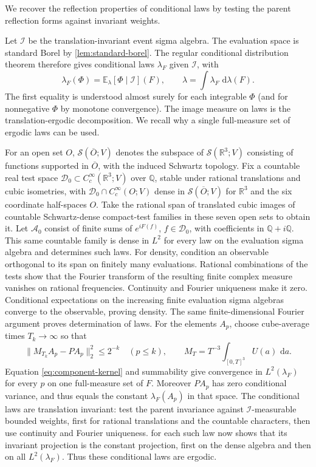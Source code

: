 \documentclass[11pt,letterpaper,reqno]{amsart}
\newcommand{\R}{\mathbb R}
\newcommand{\E}{\mathbb E}
\newcommand{\dd}{\,\mathrm d}
\newcommand{\Sspace}{\mathcal S}
\begin{document}
We recover the reflection properties of conditional laws by
testing the parent reflection forms against invariant weights.

Let $\mathcal I$ be the translation-invariant event sigma algebra.
The evaluation space is standard Borel by \cref{lem:standard-borel}.
The regular conditional distribution theorem
\cite[Theorems~4.1.16--4.1.17]{Durrett2019} therefore gives conditional laws $\lambda_F$ given $\mathcal I$, with
\begin{equation}\label{eq:component-kernel}
 \lambda_F(\Phi)=\E_\lambda[\Phi\mid\mathcal I](F),\qquad
 \lambda=\int\lambda_F\,\dd\lambda(F).
\end{equation}
The first equality is understood almost surely for each integrable
$\Phi$ (and for nonnegative $\Phi$ by monotone convergence).
The image measure on laws is the translation-ergodic decomposition.
We recall why a single full-measure set of ergodic laws can be used.

For an open set $O$, $\Sspace(\overline O;V)$ denotes
the subspace of $\Sspace(\R^3;V)$ consisting of functions
supported in $\overline O$, with the induced Schwartz topology.
Fix a countable real test space $\mathcal D_0\subset C_c^\infty(\R^3;V)$
over $\mathbb Q$, stable under rational translations and cubic
isometries, with $\mathcal D_0\cap C_c^\infty(O;V)$ dense
in $\Sspace(\overline O;V)$ for $\R^3$ and the six coordinate
half-spaces $O$. Take the rational span of translated cubic images
of countable Schwartz-dense compact-test families in these seven
open sets to obtain it.
Let $\mathcal A_0$ consist of finite sums of $e^{iF(f)}$,
$f\in\mathcal D_0$, with coefficients in $\mathbb Q+i\mathbb Q$.
This same countable family is dense in $L^2$ for every law on the
evaluation sigma algebra and determines such laws. For density,
condition an observable orthogonal to its span on finitely many
evaluations. Rational combinations of the tests show that the
Fourier transform of the resulting finite complex measure vanishes
on rational frequencies. Continuity and Fourier uniqueness make it
zero. Conditional expectations on the increasing finite evaluation
sigma algebras converge to the observable, proving density.
The same finite-dimensional Fourier argument proves determination
of laws. For the elements
$A_p$, choose cube-average times $T_k\to\infty$ so that
\[
 \|M_{T_k}A_p-PA_p\|_2^2\le2^{-k}\quad(p\le k),\qquad
 M_T=T^{-3}\int_{[0,T]^3}U(a)\,\dd a.
\]
Equation \eqref{eq:component-kernel} and summability give convergence
in $L^2(\lambda_F)$ for every $p$ on one full-measure set of $F$.
Moreover $PA_p$ has zero conditional variance, and thus equals
the constant $\lambda_F(A_p)$ in that space. The conditional laws
are translation invariant: test the parent invariance against
$\mathcal I$-measurable bounded weights, first for rational
translations and the countable characters, then use continuity and
Fourier uniqueness.  for each such law now
shows that its invariant projection is the constant projection,
first on the dense algebra and then on all $L^2(\lambda_F)$.
Thus these conditional laws are ergodic.
\end{document}
